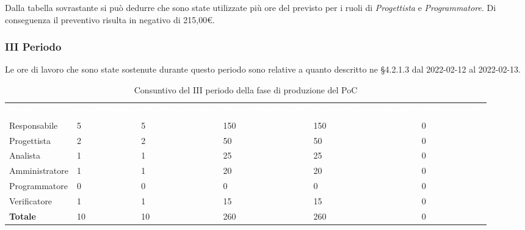 Dalla tabella sovrastante si può dedurre che sono state utilizzate più ore del previsto per i ruoli di \textit{Progettista} e \textit{Programmatore}. Di conseguenza il preventivo risulta in negativo di 215,00\euro.

\pagebreak

\subsubsection{III Periodo}
Le ore di lavoro che sono state sostenute durante questo periodo sono relative a quanto descritto ne §4.2.1.3 dal 2022-02-12 al 2022-02-13.

\begin{table}[H]
\begin{center}
\renewcommand{\arraystretch}{1.5}
\begin{tabular}{ m{}<{\centering}  m{}<{\centering} m{}<{\centering} m{}<{\centering} m{}<{\centering} m{}<{\centering}}	\rowcolor{darkblue}
	\textcolor{white}{\textbf{Ruolo}} & \textcolor{white}{\textbf{Ore Effettive}} & \textcolor{white}{\textbf{Ore Preventivate}}&\textcolor{white}{\textbf{Costo Effettivo (\euro)}}&\textcolor{white}{\textbf{Costo Preventivato (\euro)}}&\textcolor{white}{\textbf{Differenza (\euro)}}\\ 
	
	Responsabile  & 5 & 5 & 150 & 150 & 0\\	
	
	Progettista & 2 & 2 & 50 & 50 & 0\\
	
	Analista & 1  & 1 & 25 & 25 & 0 \\

	Amministratore & 1 & 1 & 20 & 20 & 0 \\
	
	Programmatore & 0 &0 &0 & 0 & 0 \\
	
	Verificatore & 1 & 1 & 15 & 15 & 0 \\
	
	\textbf{Totale} & 10 & 10 & 260 & 260 & 0 \\
	
\end{tabular}
\caption{Consuntivo del III periodo della fase di produzione del PoC}
\end{center}
\end{table}

